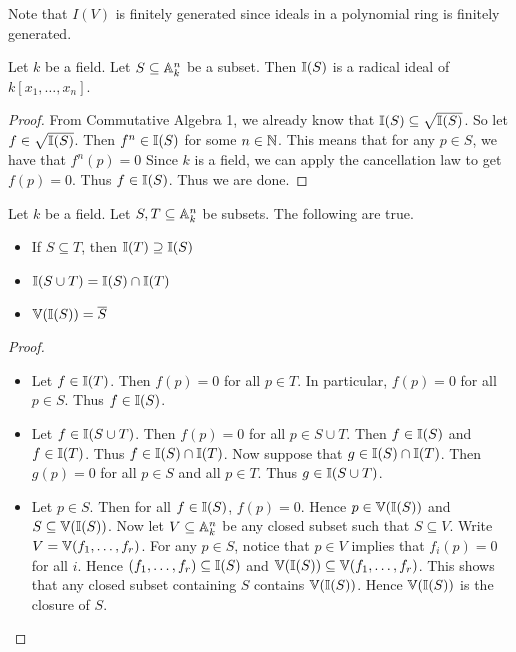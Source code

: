\documentclass[a4paper]{article}
\begin{document}
Note that $I(V)$ is finitely generated since ideals in a polynomial ring is finitely generated. 

\begin{prp}{}{} Let $k$ be a field. Let $S\subseteq\mathbb{A}_k^n$ be a subset. Then $\mathbb{I}(S)$ is a radical ideal of $k[x_1,\dots,x_n]$. \tcbline
\begin{proof}
From Commutative Algebra 1, we already know that $\mathbb{I}(S)\subseteq\sqrt{\mathbb{I}(S)}$. So let $f\in\sqrt{\mathbb{I}(S)}$. Then $f^n\in\mathbb{I}(S)$ for some $n\in\mathbb{N}$. This means that for any $p\in S$, we have that $f^n(p)=0$ Since $k$ is a field, we can apply the cancellation law to get $f(p)=0$. Thus $f\in\mathbb{I}(S)$. Thus we are done. 
\end{proof}
\end{prp}

\begin{prp}{}{} Let $k$ be a field. Let $S,T\subseteq\mathbb{A}_k^n$ be subsets. The following are true. 
\begin{itemize}
\item If $S\subseteq T$, then $\mathbb{I}(T)\supseteq\mathbb{I}(S)$
\item $\mathbb{I}(S\cup T)=\mathbb{I}(S)\cap\mathbb{I}(T)$
\item $\mathbb{V}(\mathbb{I}(S))=\overline{S}$
\end{itemize} \tcbline
\begin{proof}~\\
\begin{itemize}
\item Let $f\in\mathbb{I}(T)$. Then $f(p)=0$ for all $p\in T$. In particular, $f(p)=0$ for all $p\in S$. Thus $f\in\mathbb{I}(S)$. 
\item Let $f\in\mathbb{I}(S\cup T)$. Then $f(p)=0$ for all $p\in S\cup T$. Then $f\in\mathbb{I}(S)$ and $f\in\mathbb{I}(T)$. Thus $f\in\mathbb{I}(S)\cap\mathbb{I}(T)$. Now suppose that $g\in\mathbb{I}(S)\cap\mathbb{I}(T)$. Then $g(p)=0$ for all $p\in S$ and all $p\in T$. Thus $g\in\mathbb{I}(S\cup T)$. 
\item Let $p\in S$. Then for all $f\in\mathbb{I}(S)$, $f(p)=0$. Hence $p\in\mathbb{V}(\mathbb{I}(S))$ and $S\subseteq\mathbb{V}(\mathbb{I}(S))$. Now let $V\subseteq\mathbb{A}_k^n$ be any closed subset such that $S\subseteq V$. Write $V=\mathbb{V}(f_1,\dots,f_r)$. For any $p\in S$, notice that $p\in V$ implies that $f_i(p)=0$ for all $i$. Hence $(f_1,\dots,f_r)\subseteq\mathbb{I}(S)$ and $\mathbb{V}(\mathbb{I}(S))\subseteq\mathbb{V}(f_1,\dots,f_r)$. This shows that any closed subset containing $S$ contains $\mathbb{V}(\mathbb{I}(S))$. Hence $\mathbb{V}(\mathbb{I}(S))$ is the closure of $S$. 
\end{itemize}
\end{proof}
\end{prp}
\end{document}
